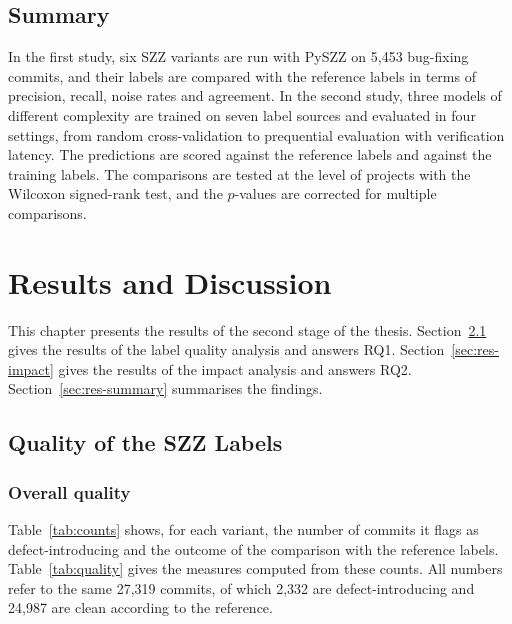 \documentclass[12pt,a4paper,oneside]{report}
\begin{document}
\section{Summary}

In the first study, six SZZ variants are run with PySZZ on 5,453 bug-fixing
commits, and their labels are compared with the reference labels in terms of
precision, recall, noise rates and agreement. In the second study, three
models of different complexity are trained on seven label sources and
evaluated in four settings, from random cross-validation to prequential
evaluation with verification latency. The predictions are scored against the
reference labels and against the training labels. The comparisons are tested
at the level of projects with the Wilcoxon signed-rank test, and the
$p$-values are corrected for multiple comparisons.

\chapter{Results and Discussion}\label{ch:results}

This chapter presents the results of the second stage of the thesis.
Section~\ref{sec:res-quality} gives the results of the label quality analysis
and answers RQ1. Section~\ref{sec:res-impact} gives the results of the impact
analysis and answers RQ2. Section~\ref{sec:res-summary} summarises the
findings.

\section{Quality of the SZZ Labels}\label{sec:res-quality}

\subsection{Overall quality}

Table~\ref{tab:counts} shows, for each variant, the number of commits it
flags as defect-introducing and the outcome of the comparison with the
reference labels. Table~\ref{tab:quality} gives the measures computed from
these counts. All numbers refer to the same 27,319 commits, of which 2,332
are defect-introducing and 24,987 are clean according to the reference.
\end{document}
